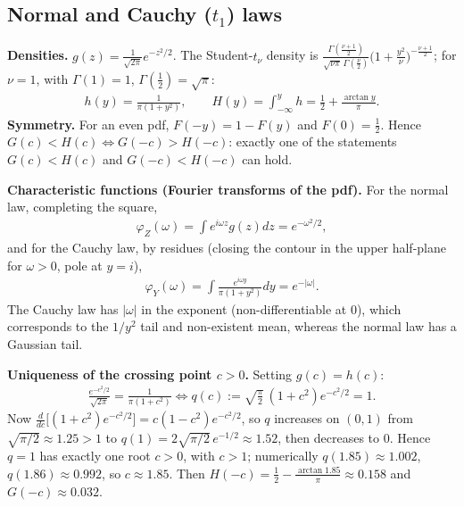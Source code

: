 \subsection{Normal and Cauchy ($t_1$) laws}
\textbf{Densities.} $g(z)=\frac1{\sqrt{2\pi}}e^{-z^2/2}$. The Student-$t_\nu$ density is
$\frac{\Gamma(\frac{\nu+1}2)}{\sqrt{\nu\pi}\,\Gamma(\frac\nu2)}\big(1+\frac{y^2}\nu\big)^{-\frac{\nu+1}2}$; for $\nu=1$,
with $\Gamma(1)=1$, $\Gamma(\tfrac12)=\sqrt\pi$:
\begin{align}
h(y)=\frac1{\pi(1+y^2)},\qquad H(y)=\int_{-\infty}^y h=\frac12+\frac{\arctan y}\pi. \label{eq:cauchy}
\end{align}
\textbf{Symmetry.} For an even pdf, $F(-y)=1-F(y)$ and $F(0)=\tfrac12$. Hence $G(c)<H(c)\iff G(-c)>H(-c)$:
exactly one of the statements $G(c)<H(c)$ and $G(-c)<H(-c)$ can hold.

\textbf{Characteristic functions (Fourier transforms of the pdf).}
For the normal law, completing the square,
\begin{align}
\varphi_Z(\omega)=\int e^{i\omega z}g(z)dz=e^{-\omega^2/2},
\end{align}
and for the Cauchy law, by residues (closing the contour in the upper half-plane for $\omega>0$, pole at $y=i$),
\begin{align}
\varphi_Y(\omega)=\int\frac{e^{i\omega y}}{\pi(1+y^2)}dy=e^{-|\omega|}.
\end{align}
The Cauchy law has $|\omega|$ in the exponent (non-differentiable at $0$), which corresponds to the
$1/y^2$ tail and non-existent mean, whereas the normal law has a Gaussian tail.

\textbf{Uniqueness of the crossing point $c>0$.} Setting $g(c)=h(c)$:
\begin{align}
\frac{e^{-c^2/2}}{\sqrt{2\pi}}=\frac1{\pi(1+c^2)}\iff
q(c):=\sqrt{\tfrac\pi2}\,(1+c^2)e^{-c^2/2}=1. \label{eq:crossing}
\end{align}
Now $\frac d{dc}\big[(1+c^2)e^{-c^2/2}\big]=c(1-c^2)e^{-c^2/2}$, so $q$ increases on $(0,1)$ from
$\sqrt{\pi/2}\approx1.25>1$ to $q(1)=2\sqrt{\pi/2}\,e^{-1/2}\approx1.52$, then decreases to $0$. Hence $q=1$ has
exactly one root $c>0$, with $c>1$; numerically $q(1.85)\approx1.002$, $q(1.86)\approx0.992$, so $c\approx1.85$.
Then $H(-c)=\tfrac12-\frac{\arctan1.85}\pi\approx0.158$ and $G(-c)\approx0.032$.

